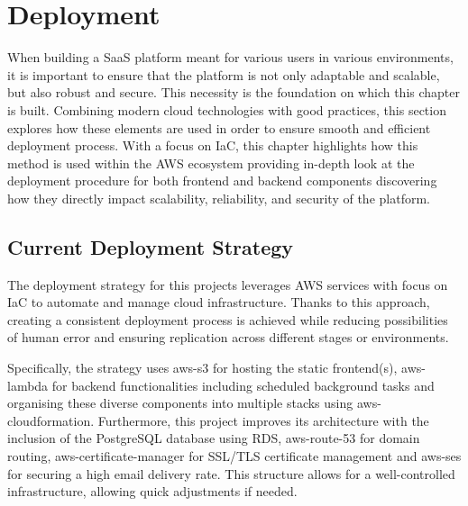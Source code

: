\chapter{Deployment}
\label{chap:deployment}
When building a \ac{SaaS} platform meant for various users in various environments, it is important to ensure that the platform is not only adaptable and scalable, but also robust and secure.
This necessity is the foundation on which this chapter is built.
Combining modern cloud technologies with good practices, this section explores how these elements are used in order to ensure smooth and efficient deployment process.
With a focus on \ac{IaC}, this chapter highlights how this method is used within the \ac{AWS} ecosystem providing in-depth look at the deployment procedure for both frontend and backend components discovering how they directly impact scalability, reliability, and security of the platform.

\section{Current Deployment Strategy}
\label{sec:current-deployment-strategy}

The deployment strategy for this projects leverages \ac{AWS} services with focus on \ac{IaC} to automate and manage cloud infrastructure.
Thanks to this approach, creating a consistent deployment process is achieved while reducing possibilities of human error and ensuring replication across different stages or environments.

Specifically, the strategy uses \gls{aws-s3} for hosting the static frontend(s), \gls{aws-lambda} for backend functionalities including scheduled background tasks and organising these diverse components into multiple stacks using \gls{aws-cloudformation}.
Furthermore, this project improves its architecture with the inclusion of the PostgreSQL database using \ac{RDS}, \gls{aws-route-53} for domain routing, \gls{aws-certificate-manager} for SSL/TLS certificate management and \gls{aws-ses} for securing a high email delivery rate.
This structure allows for a well-controlled infrastructure, allowing quick adjustments if needed.

